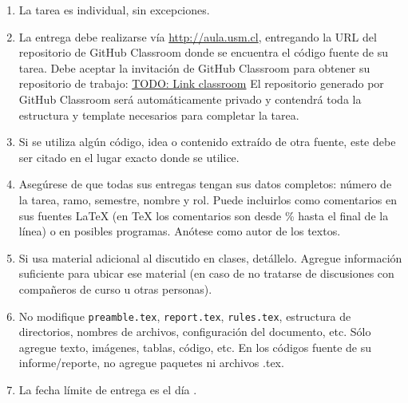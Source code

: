 \begin{enumerate}[(1)]
  \item La tarea es individual, sin excepciones.

  \item La entrega debe realizarse vía \url{http://aula.usm.cl}, entregando la URL del repositorio de GitHub Classroom donde se encuentra el código fuente de su tarea.  
  Debe aceptar la invitación de GitHub Classroom para obtener su repositorio de trabajo:  
  \url{TODO: Link classroom}  
  El repositorio generado por GitHub Classroom será automáticamente privado y contendrá toda la estructura y template necesarios para completar la tarea.

  \item Si se utiliza algún código, idea o contenido extraído de otra fuente, este debe ser citado en el lugar exacto donde se utilice.

  \item Asegúrese de que todas sus entregas tengan sus datos completos: número de la tarea, ramo, semestre, nombre y rol. Puede incluirlos como comentarios en sus fuentes \LaTeX{} (en \TeX{} los comentarios son desde \% hasta el final de la línea) o en posibles programas. Anótese como autor de los textos.

  \item Si usa material adicional al discutido en clases, detállelo. Agregue información suficiente para ubicar ese material (en caso de no tratarse de discusiones con compañeros de curso u otras personas).

  \item No modifique \texttt{preamble.tex}, \texttt{report.tex}, \texttt{rules.tex}, estructura de directorios, nombres de archivos, configuración del documento, etc. Sólo agregue texto, imágenes, tablas, código, etc. En los códigos fuente de su informe/reporte, no agregue paquetes ni archivos .tex.

  \item La fecha límite de entrega es el día \tcm{\deadline}.
\end{enumerate}
